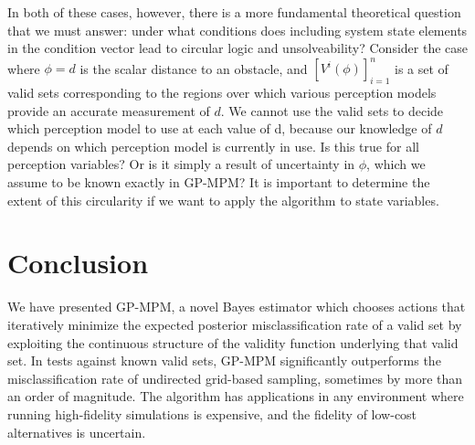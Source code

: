 \documentclass[12pt, conference]{IEEEtran}
\begin{document}
In both of these cases, however, there is a more fundamental theoretical question that we must answer: under what conditions does including system state elements in the condition vector lead to circular logic and unsolveability? Consider the case where $\phi=d$ is the scalar distance to an obstacle, and $[V^i(\phi)]_{i=1}^n$ is a set of valid sets corresponding to the regions over which various perception models provide an accurate measurement of $d$. We cannot use the valid sets to decide which perception model to use at each value of d, because our knowledge of $d$ depends on which perception model is currently in use. Is this true for all perception variables? Or is it simply a result of uncertainty in $\phi$, which we assume to be known exactly in GP-MPM? It is important to determine the extent of this circularity if we want to apply the algorithm to state variables.

\section{Conclusion}

We have presented GP-MPM, a novel Bayes estimator which chooses actions that iteratively minimize the expected posterior misclassification rate of a valid set by exploiting the continuous structure of the validity function underlying that valid set. In tests against known valid sets, GP-MPM significantly outperforms the misclassification rate of undirected grid-based sampling, sometimes by more than an order of magnitude. The algorithm has applications in any environment where running high-fidelity simulations is expensive, and the fidelity of low-cost alternatives is uncertain.
\end{document}
